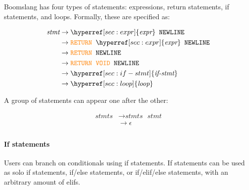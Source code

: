 \documentclass{article}
\begin{document}
Boomslang has four types of statements: expressions, return statements, if statements, and loops. Formally, these are specified as:

\label{sec:stmt}
\begin{align*}
    \textit{stmt} &\to \hyperref[sec:expr]{\textit{expr}} \texttt{ } \texttt{NEWLINE} \\
    &\to \textcolor{orange}{\texttt{RETURN}} \texttt{ } \hyperref[sec:expr]{\textit{expr}} \texttt{ } \texttt{NEWLINE} \\
    &\to \textcolor{orange}{\texttt{RETURN}} \texttt{ } \texttt{NEWLINE} \\
    &\to \textcolor{orange}{\texttt{RETURN}} \texttt{ } \textcolor{orange}{\texttt{VOID}} \texttt{ } \texttt{NEWLINE} \\
    &\to \hyperref[sec:if-stmt]{\textit{if-stmt}} \\
    &\to \hyperref[sec:loop]{\textit{loop}} \\
\end{align*}

A group of statements can appear one after the other:

\label{sec:stmts}
\begin{align*}
    \textit{stmts} &\to \hyperref[sec:stmts]{\textit{stmts}} \texttt{ } \hyperref[sec:stmt]{\textit{stmt}}  \\
    &\to \epsilon \\
\end{align*}

\paragraph{If statements}
Users can branch on conditionals using if statements. If statements can be used as solo if statements, if/else statements, or if/elif/else statements, with an arbitrary amount of elifs.
\end{document}
